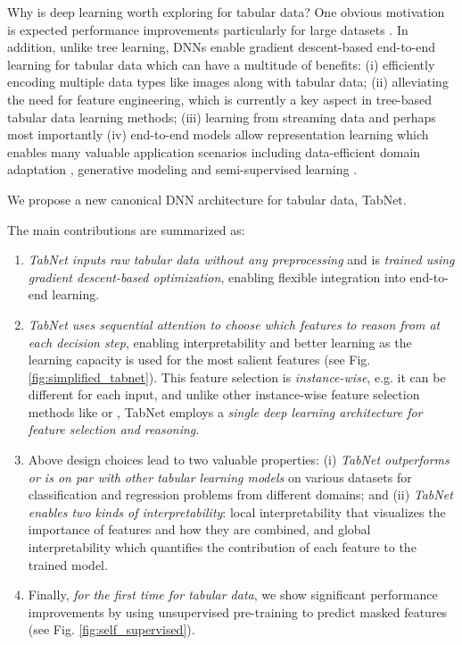 Why is deep learning worth exploring for tabular data? One obvious motivation is expected performance improvements particularly for large datasets \citep{deep_learning_scaling}. In addition, unlike tree learning, DNNs enable gradient descent-based end-to-end learning for tabular data which can have a multitude of benefits: (i) efficiently encoding multiple data types like images along with tabular data; (ii) alleviating the need for feature engineering, which is currently a key aspect in tree-based tabular data learning methods; (iii) learning from streaming data and perhaps most importantly (iv) end-to-end models allow representation learning which enables many valuable application scenarios including data-efficient domain adaptation \citep{Goodfellow2016}, generative modeling \citep{unsupervised_rep_gan} and semi-supervised learning \citep{good_ssl}.

We propose a new canonical DNN architecture for tabular data, TabNet.

The main contributions are summarized as:

\begin{enumerate}[noitemsep, nolistsep, leftmargin=*]
\item \emph{TabNet inputs raw tabular data without any preprocessing} and is \emph{trained using gradient descent-based optimization}, enabling flexible integration into end-to-end learning. 
\item \emph{TabNet uses sequential attention to choose which features to reason from at each decision step}, enabling interpretability and better learning as the learning capacity is used for the most salient features (see Fig. \ref{fig:simplified_tabnet}). 
This feature selection is \emph{instance-wise}, e.g. it can be different for each input, and unlike other instance-wise feature selection methods like \citep{l2x} or \citep{invase}, TabNet employs a \emph{single deep learning architecture for feature selection and reasoning}. 
\item Above design choices lead to two valuable properties: (i) \emph{TabNet outperforms or is on par with other tabular learning models} on various datasets for classification and regression problems from different domains; and (ii) \emph{TabNet enables two kinds of interpretability}: local interpretability that visualizes the importance of features and how they are combined, and global interpretability which quantifies the contribution of each feature to the trained model. 
\item Finally, \emph{for the first time for tabular data}, we show significant performance improvements by using unsupervised pre-training to predict masked features (see Fig. \ref{fig:self_supervised}). 

\end{enumerate}

